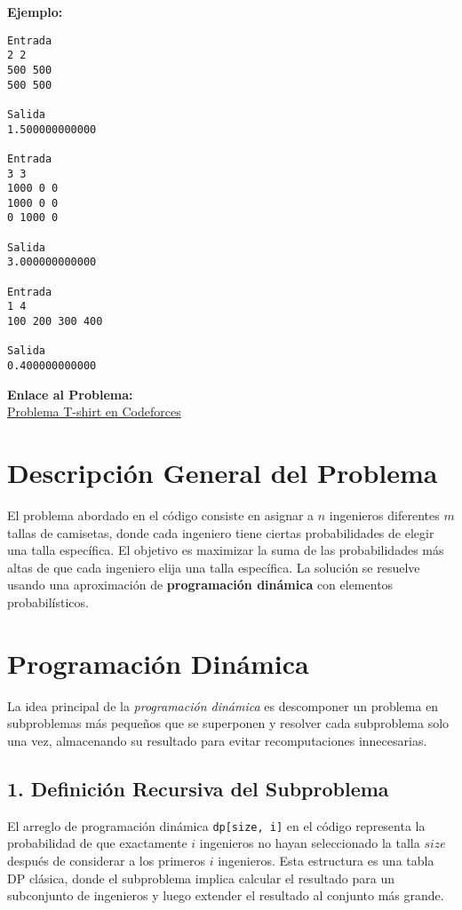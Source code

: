 \documentclass{article}
\begin{document}
\textbf{Ejemplo:}
\begin{verbatim}
Entrada
2 2
500 500
500 500

Salida
1.500000000000

Entrada
3 3
1000 0 0
1000 0 0
0 1000 0

Salida
3.000000000000

Entrada
1 4
100 200 300 400

Salida
0.400000000000
\end{verbatim}

\textbf{Enlace al Problema:} \\
\href{https://codeforces.com/contest/183/problem/D}{Problema T-shirt en Codeforces}
\section*{Descripción General del Problema}

El problema abordado en el código consiste en asignar a $n$ ingenieros diferentes $m$ tallas de camisetas, donde cada ingeniero tiene ciertas probabilidades de elegir una talla específica. El objetivo es maximizar la suma de las probabilidades más altas de que cada ingeniero elija una talla específica. La solución se resuelve usando una aproximación de \textbf{programación dinámica} con elementos probabilísticos.

\section*{Programación Dinámica}

La idea principal de la \textit{programación dinámica} es descomponer un problema en subproblemas más pequeños que se superponen y resolver cada subproblema solo una vez, almacenando su resultado para evitar recomputaciones innecesarias.

\subsection*{1. Definición Recursiva del Subproblema}

El arreglo de programación dinámica \texttt{dp[size, i]} en el código representa la probabilidad de que exactamente $i$ ingenieros no hayan seleccionado la talla $size$ después de considerar a los primeros $i$ ingenieros. Esta estructura es una tabla DP clásica, donde el subproblema implica calcular el resultado para un subconjunto de ingenieros y luego extender el resultado al conjunto más grande.
\end{document}
